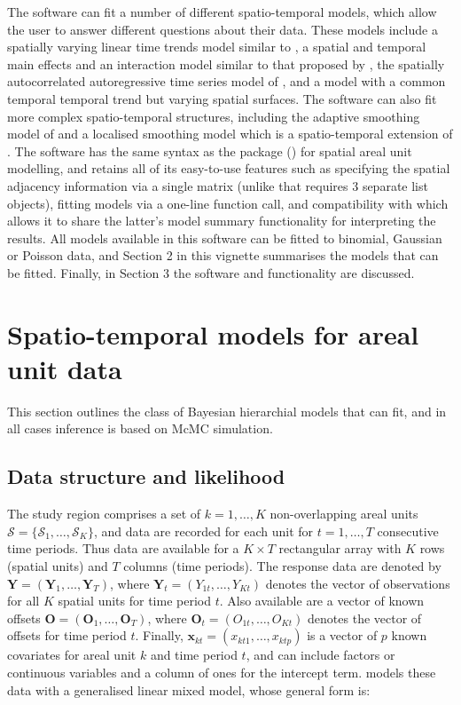 \documentclass[article,shortnames,nojss]{jss}
\begin{document}
The software can fit a number of different spatio-temporal models, which allow the user to answer different questions about their data. These models include a spatially varying linear time trends model similar to \cite{bernardinelli1995}, a spatial and temporal main effects and an interaction model similar to that proposed by \cite{knorrheld2000}, the spatially autocorrelated autoregressive time series model of \cite{rushworth2014}, and a model with a common temporal temporal trend but varying spatial surfaces. The software can also fit more complex spatio-temporal structures, including the adaptive smoothing model of \cite{rushworth2014b} and a localised smoothing model which is a spatio-temporal extension of \cite{lee2015b}. The software has the same syntax as the  package  (\citealp{lee2013}) for spatial areal unit modelling, and retains all of its easy-to-use features such as specifying the spatial adjacency information via a single matrix (unlike  that requires 3 separate list objects), fitting models via a one-line function call, and compatibility with  which allows it to share the latter's model summary functionality for interpreting the results. All models available in this software can be fitted to binomial, Gaussian or Poisson data, and Section 2 in this vignette summarises the models that can be fitted. Finally, in Section 3 the software and functionality are discussed.



\section{Spatio-temporal models for areal unit data}
This section outlines the class of Bayesian hierarchial models that  can fit, and in all cases inference is based on McMC simulation.


\subsection{Data structure and likelihood}
The study region comprises a set of $k=1,\ldots,K$ non-overlapping areal units $\mathcal{S}=\{\mathcal{S}_{1},\ldots,\mathcal{S}_{K}\}$, and data are recorded for each unit for $t=1,\ldots,T$ consecutive time periods. Thus data are available for a $K\times T$ rectangular array with $K$ rows (spatial units) and $T$ columns (time periods). The response data are denoted by $\mathbf{Y}=(\mathbf{Y}_{1},\ldots,\mathbf{Y}_{T})$, where $\mathbf{Y}_{t}=(Y_{1t},\ldots,Y_{Kt})$ denotes the vector of observations for all $K$ spatial units for time period $t$. Also available are a vector of known offsets $\mathbf{O}=(\mathbf{O}_{1},\ldots,\mathbf{O}_{T})$, where $\mathbf{O}_{t}=(O_{1t},\ldots,O_{Kt})$ denotes the vector of offsets for time period $t$. Finally, $\mathbf{x}_{kt}=(x_{kt1},\ldots, x_{ktp})$ is a vector of $p$ known covariates for areal unit $k$ and time period $t$, and can include factors or continuous variables and a column of ones for the intercept term.  models these data with a generalised linear mixed model, whose general form is:
\end{document}
